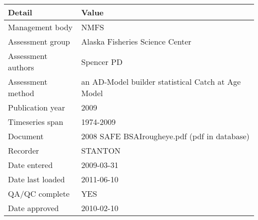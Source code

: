 \begin{table}[htb]
\centering
\begin{tabular}{lp{7cm}}
\toprule
Detail & Value \\
\midrule
Management body    & NMFS                                               \\
Assessment group   & Alaska Fisheries Science Center                    \\
Assessment authors & Spencer PD                                         \\
Assessment method  & an AD-Model builder statistical Catch at Age Model \\
Publication year   & 2009                                               \\
Timeseries span    & 1974-2009                                          \\
Document           & 2008 SAFE BSAIrougheye.pdf (pdf in database)       \\
Recorder           & STANTON                                            \\
Date entered       & 2009-03-31                                         \\
Date last loaded   & 2011-06-10                                         \\
QA/QC complete     & YES                                                \\
Date approved      & 2010-02-10                                         \\
\bottomrule
\end{tabular}
\label{tab:assessdet}
\end{table}
